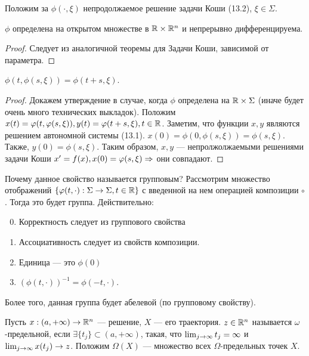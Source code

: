 Положим за \(\phi(\cdot, \xi)\) непродолжаемое решение задачи Коши (13.2), \(\xi \in \Sigma\).

\begin{proposition}
    \(\phi\) определена на открытом множестве в \(\mathbb{R} \times \mathbb{R}^n\) и непрерывно дифференцируема.
\end{proposition}
\begin{proof}
    Следует из аналогичной теоремы для Задачи Коши, зависимой от параметра.
\end{proof}

\begin{proposition}
    \(\phi(t, \phi(s, \xi)) = \phi(t + s, \xi)\).
\end{proposition}
\begin{proof}
    Докажем утверждение в случае, когда \(\phi\) определена на \(\mathbb{R} \times \Sigma\) (иначе будет очень много технических выкладок). Положим \(x(t) = \varphi(t, \varphi(s, \xi)), y(t) = \varphi(t + s, \xi), t \in \mathbb{R}\). Заметим, что функции \(x, y\) являются решением автономной системы (13.1). \(x(0) = \phi(0, \phi(s, \xi)) = \phi(s, \xi)\). Также, \(y(0) = \phi(s, \xi)\). Таким образом, \(x, y\) --- непролжолжаемыми решениями задачи Коши \(x' = f(x), x(0) = \varphi(s, \xi) \Rightarrow\) они совпадают.
\end{proof}

\begin{note}
    Почему данное свойство называется групповым? Рассмотрим множество отображений \(\{\varphi(t, \cdot): \Sigma \rightarrow \Sigma, t \in \mathbb{R}\}\) с введенной на нем операцией композиции \(\circ\). Тогда это будет группа. Действительно:
    \begin{enumerate}
        \setcounter{enumi}{-1}
        \item Корректность следует из группового свойства
        \item Ассоциативность следует из свойств композиции.
        \item Единица --- это \(\phi(0)\)
        \item \((\phi(t, \cdot))^{-1} = \phi(-t, \cdot)\).
    \end{enumerate}
    Более того, данная группа будет абелевой (по групповому свойству).
\end{note}

\begin{definition}
    Пусть \(x: (a, +\infty) \rightarrow \mathbb{R}^n\) --- решение, \(X\) --- его траектория. \(z \in \mathbb{R}^n\) называется \(\omega\)-предельной, если \(\exists \{t_j\} \subset (a, +\infty)\), такая, что \(\lim_{j \rightarrow \infty} t_j = \infty\) и \(\lim_{j \rightarrow \infty} x(t_j) \rightarrow z\). Положим \(\Omega(X)\) --- множество всех \(\Omega\)-предельных точек \(X\).
\end{definition}

